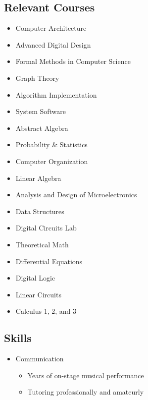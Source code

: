 \documentclass[18pt]{article}
\providecommand{\tightlist}{
    \setlength{\itemsep}{0pt}\setlength{\parskip}{0pt}
}
\begin{document}
  \begin{multicols}{2}
    
    \subsection*{Relevant Courses}\label{relevant-courses}
      \begin{itemize}
        \item Computer Architecture
        \item Advanced Digital Design
        \item Formal Methods in Computer Science
        \item Graph Theory
        \item Algorithm Implementation
        \item System Software
        \item Abstract Algebra
        \item Probability \& Statistics
        \item Computer Organization
        \item Linear Algebra
        \item Analysis and Design of Microelectronics
        \item Data Structures
        \item Digital Circuits Lab
        \item Theoretical Math
        \item Differential Equations
        \item Digital Logic
        \item Linear Circuits
        \item Calculus 1, 2, and 3
      \end{itemize} 
    
  \vfill
  \columnbreak
    
    \subsection*{Skills}\label{skills}
      \begin{itemize}\tightlist
        
        \item Communication
        \begin{itemize}\tightlist
          \item Years of on-stage musical performance
          \item Tutoring professionally and amateurly
        \end{itemize}
        

\end{itemize}
\end{multicols}
\end{document}
